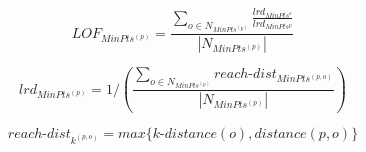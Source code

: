 \begin{equation} \label{eq:lof}
  LOF_{MinPts^{(p)}} =  \frac{ \sum\limits_{o\in N_{MinPts^{(p)}}} \frac{lrd_{MinPts^{o}}}{lrd_{MinPts^{p}}}}  {|N_{MinPts^{(p)}}|}  
\end{equation}

\begin{equation} \label{eq:lrd}
 lrd_{MinPts^{(p)}} = 1 / \left ( \frac{ \sum\limits_{o\in N_{MinPts^{(p)}}} reach\text{-}dist_{MinPts^{(p,o)}} } {|N_{MinPts^{(p)}}|}  \right) 
\end{equation}

\begin{equation} \label{eq:reach}
reach\text{-}dist_{k^{(p,o)}} = max\{k\text{-}distance(o), distance(p,o)\}
\end{equation}


